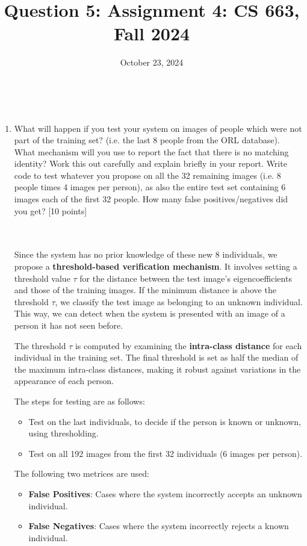 \documentclass{article}
\title{Question 5: Assignment 4: CS 663, Fall 2024}
\author{
\IEEEauthorblockN{
    \begin{tabular}{cccc}
        \begin{minipage}[t]{0.23\textwidth}
            \centering
            Amitesh Shekhar\\
            IIT Bombay\\
            22b0014@iitb.ac.in
        \end{minipage} & 
        \begin{minipage}[t]{0.23\textwidth}
            \centering
            Anupam Rawat\\
            IIT Bombay\\
            22b3982@iitb.ac.in
        \end{minipage} & 
        \begin{minipage}[t]{0.23\textwidth}
            \centering
            Toshan Achintya Golla\\
            IIT Bombay\\
            22b2234@iitb.ac.in
        \end{minipage} \\
        \\ 
    \end{tabular}
}
}
\date{October 23, 2024}
\begin{document}
\maketitle

\\

\begin{enumerate}
\item 
What will happen if you test your system on images of people which were not part of the training set? (i.e. the last 8 people from the ORL database). What mechanism will you use to report the fact that there is no matching identity? Work this out carefully and explain briefly in your report. Write code to test whatever you propose on all the 32 remaining images (i.e. 8 people times 4 images per person), as also the entire test set containing 6 images each of the first 32 people. How many false positives/negatives did you get? \textsf{[10 points]}

\\
\\

Since the system has no prior knowledge of these new 8 individuals, we propose a \textbf{threshold-based verification mechanism}. It involves setting a threshold value $\tau$ for the distance between the test image's eigencoefficients and those of the training images. If the minimum distance is above the threshold $\tau$, we classify the test image as belonging to an unknown individual. This way, we can detect when the system is presented with an image of a person it has not seen before.

The threshold $\tau$ is computed by examining the \textbf{intra-class distance} for each individual in the training set. The final threshold is set as half the median of the maximum intra-class distances, making it robust against variations in the appearance of each person.

The steps for testing are as follows:
\begin{itemize}
    \item Test on the last individuals, to decide if the person is known or unknown, using thresholding.
    \item Test on all 192 images from the first 32 individuals (6 images per person).
\end{itemize}

The following two metrices are used:
\begin{itemize}
    \item \textbf{False Positives}: Cases where the system incorrectly accepts an unknown individual.
    \item \textbf{False Negatives}: Cases where the system incorrectly rejects a known individual.
\end{itemize}


\end{enumerate}
\end{document}
